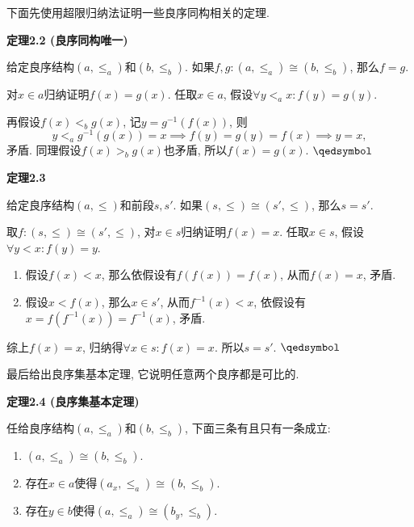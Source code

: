 \documentclass[UTF8]{ctexart}
\begin{document}
\vspace{10pt}

下面先使用超限归纳法证明一些良序同构相关的定理.

\vspace{10pt}

\hypertarget{sec:定理2.2}{}
\noindent\textbf{定理2.2 (良序同构唯一)}

给定良序结构$(a,\leqslant_a)$和$(b,\leqslant_b)$.
如果$f,g:(a,\leqslant_a)\cong(b,\leqslant_b)$, 那么$f=g$.


对$x\in a$归纳证明$f(x)=g(x)$. 任取$x\in a$, 假设$\forall y<_ax:f(y)=g(y)$.

再假设$f(x)<_bg(x)$, 记$y=g^{-1}(f(x))$, 则
\[
    y<_ag^{-1}(g(x))=x\implies f(y)=g(y)=f(x)\implies y=x,
\]
矛盾. 同理假设$f(x)>_bg(x)$也矛盾, 所以$f(x)=g(x)$. \hfill $\qedsymbol$

\vspace{10pt}

\hypertarget{sec:定理2.3}{}
\noindent\textbf{定理2.3}

给定良序结构$(a,\leqslant)$和前段$s,s'$.
如果$(s,\leqslant)\cong(s',\leqslant)$, 那么$s=s'$.


取$f:(s,\leqslant)\cong(s',\leqslant)$, 对$x\in s$归纳证明$f(x)=x$.
任取$x\in s$, 假设$\forall y<x:f(y)=y$.

\begin{enumerate}
    \item 假设$f(x)<x$, 那么依假设有$f(f(x))=f(x)$, 从而$f(x)=x$, 矛盾.
    \item 假设$x<f(x)$, 那么$x\in s'$, 从而$f^{-1}(x)<x$,
    依假设有$x=f(f^{-1}(x))=f^{-1}(x)$, 矛盾.
\end{enumerate}
综上$f(x)=x$, 归纳得$\forall x\in s:f(x)=x$. 所以$s=s'$. \hfill $\qedsymbol$





\newpage

最后给出良序集基本定理, 它说明任意两个良序都是可比的.

\vspace{10pt}

\hypertarget{sec:定理2.4}{}
\noindent\textbf{定理2.4 (良序集基本定理)}

任给良序结构$(a,\leqslant_a)$和$(b,\leqslant_b)$, 下面三条有且只有一条成立:
\begin{enumerate}
    \item $(a,\leqslant_a)\cong(b,\leqslant_b)$.
    \item 存在$x\in a$使得$(a_x,\leqslant_a)\cong(b,\leqslant_b)$.
    \item 存在$y\in b$使得$(a,\leqslant_a)\cong(b_y,\leqslant_b)$.
\end{enumerate}
\end{document}
